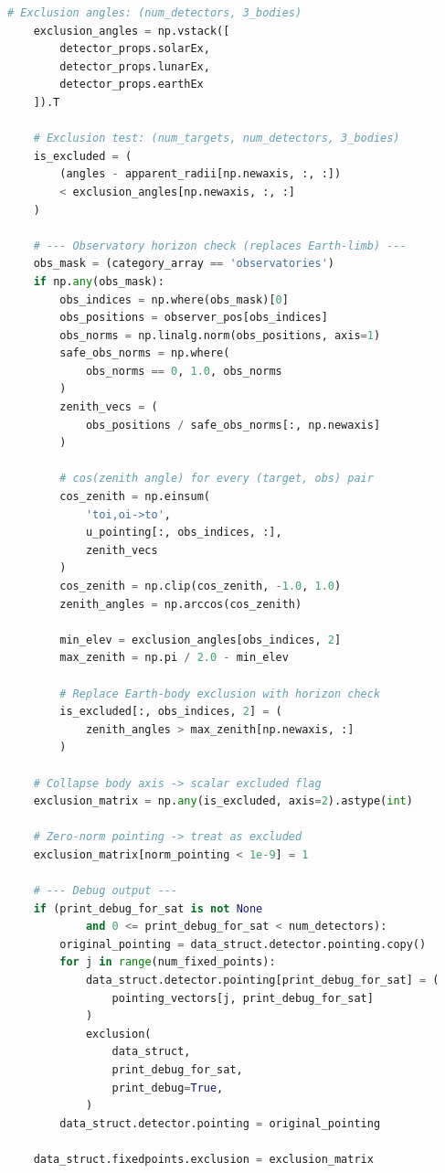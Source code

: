 \documentclass[10pt,a4paper]{report}
\begin{document}
\begin{lstlisting}[language=Python,caption={exclusion.py Source Code},label={code:exclusion}]
    # Exclusion angles: (num_detectors, 3_bodies)
    exclusion_angles = np.vstack([
        detector_props.solarEx,
        detector_props.lunarEx,
        detector_props.earthEx
    ]).T

    # Exclusion test: (num_targets, num_detectors, 3_bodies)
    is_excluded = (
        (angles - apparent_radii[np.newaxis, :, :])
        < exclusion_angles[np.newaxis, :, :]
    )

    # --- Observatory horizon check (replaces Earth-limb) ---
    obs_mask = (category_array == 'observatories')
    if np.any(obs_mask):
        obs_indices = np.where(obs_mask)[0]
        obs_positions = observer_pos[obs_indices]
        obs_norms = np.linalg.norm(obs_positions, axis=1)
        safe_obs_norms = np.where(
            obs_norms == 0, 1.0, obs_norms
        )
        zenith_vecs = (
            obs_positions / safe_obs_norms[:, np.newaxis]
        )

        # cos(zenith angle) for every (target, obs) pair
        cos_zenith = np.einsum(
            'toi,oi->to',
            u_pointing[:, obs_indices, :],
            zenith_vecs
        )
        cos_zenith = np.clip(cos_zenith, -1.0, 1.0)
        zenith_angles = np.arccos(cos_zenith)

        min_elev = exclusion_angles[obs_indices, 2]
        max_zenith = np.pi / 2.0 - min_elev

        # Replace Earth-body exclusion with horizon check
        is_excluded[:, obs_indices, 2] = (
            zenith_angles > max_zenith[np.newaxis, :]
        )

    # Collapse body axis -> scalar excluded flag
    exclusion_matrix = np.any(is_excluded, axis=2).astype(int)

    # Zero-norm pointing -> treat as excluded
    exclusion_matrix[norm_pointing < 1e-9] = 1

    # --- Debug output ---
    if (print_debug_for_sat is not None
            and 0 <= print_debug_for_sat < num_detectors):
        original_pointing = data_struct.detector.pointing.copy()
        for j in range(num_fixed_points):
            data_struct.detector.pointing[print_debug_for_sat] = (
                pointing_vectors[j, print_debug_for_sat]
            )
            exclusion(
                data_struct,
                print_debug_for_sat,
                print_debug=True,
            )
        data_struct.detector.pointing = original_pointing

    data_struct.fixedpoints.exclusion = exclusion_matrix


\end{lstlisting}
\end{document}
